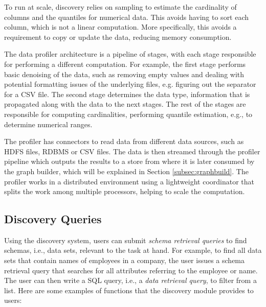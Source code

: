 
To run at scale, discovery relies on sampling to estimate the cardinality of
columns and the quantiles for numerical data. This avoids having to sort each
column, which is not a linear computation.  More specifically, this avoids a
requirement to copy or update the data, reducing memory consumption.

The data profiler architecture is a pipeline of stages, with each stage
responsible for performing a different computation. For example, the first stage
performs basic denoising of the data, such as removing empty values and dealing
with potential formatting issues of the underlying files, e.g. figuring out the
separator for a CSV file.  The second stage determines the data type,
information that is propagated along with the data to the next stages. The rest
of the stages are responsible for computing cardinalities, performing quantile
estimation, e.g., to determine numerical ranges.

The profiler has connectors to read data from different data sources, such as
HDFS files, RDBMS or CSV files. The data is then streamed through the profiler
pipeline which outputs the results
to a store from where it is later consumed by the graph builder, which will be
explained in Section \ref{subsec:graphbuild}.
The profiler works in a distributed environment using a lightweight coordinator
that splits the work among multiple processors, helping to scale the
computation.



\subsection{Discovery Queries}
\label{subsec:api}

Using the discovery system, users can submit \emph{schema retrieval queries}
to find schemas, i.e., data sets, relevant to the task at hand. 
For example, to find all data sets that contain names of
employees in a company, the user issues a schema retrieval query that searches for all
attributes referring to the employee or name.
The user can then write a SQL query, i.e., a \emph{data retrieval query}, to filter from a list. 
Here are some examples of functions that the discovery module provides to users:

